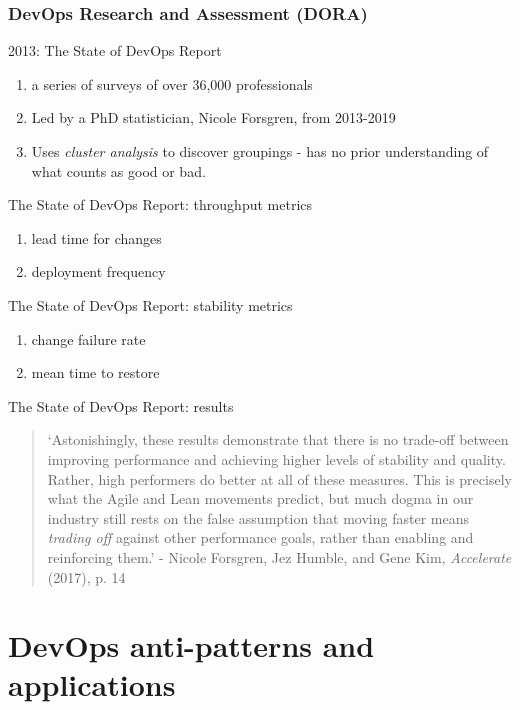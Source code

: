 \documentclass{beamer}
\begin{document}
	\subsubsection{DevOps Research and Assessment (DORA)}
	\begin{frame}{2013: The State of DevOps Report}
		\begin{enumerate}
			\item a series of surveys of over 36,000 professionals \pause
			\item Led by a PhD statistician, Nicole Forsgren, from 2013-2019 \pause
			\item Uses \emph{cluster analysis} to discover groupings - has no prior understanding of what counts as good or bad.
		\end{enumerate}
	\end{frame}
	\begin{frame}{The State of DevOps Report: throughput metrics}
		\begin{enumerate}
			\item lead time for changes \pause
			\item deployment frequency 
		\end{enumerate}
	\end{frame}
	\begin{frame}{The State of DevOps Report: stability metrics}
		\begin{enumerate}
			\item change failure rate \pause
			\item mean time to restore
		\end{enumerate}
	\end{frame}
	\begin{frame}{The State of DevOps Report: results}
		\begin{quote}
			`Astonishingly, these results demonstrate that there is no trade-off between improving performance and achieving higher levels of stability and quality. Rather, high performers do better at all of these measures. This is precisely what the Agile and Lean movements predict, but much dogma in our industry still rests on the false assumption that moving faster means \emph{trading off} against other performance goals, rather than enabling and reinforcing them.'  - Nicole Forsgren, Jez Humble, and Gene Kim, \emph{Accelerate} (2017), p. 14
		\end{quote}
	\end{frame}
	\section{DevOps anti-patterns and applications}
\end{document}
